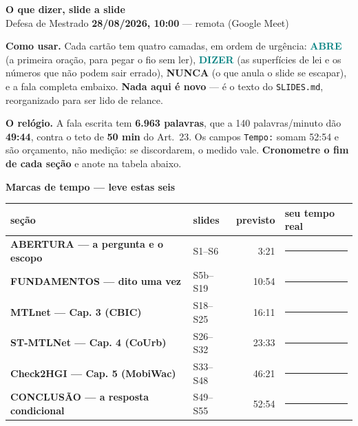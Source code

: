 \documentclass[11pt,a4paper]{article}
\begin{document}
\begin{center}
{\Huge\bfseries\color{teal} O que dizer, slide a slide}\\[3mm]
{\large Defesa de Mestrado \textbf{28/08/2026, 10:00} --- remota (Google Meet)}
\end{center}
\vspace{3mm}
\begin{tcolorbox}[colback=band,colframe=teal,boxrule=0.8pt,arc=2pt]
\textbf{Como usar.} Cada cartão tem quatro camadas, em ordem de urgência:
\textbf{\textcolor{teal}{ABRE}} (a primeira oração, para pegar o fio sem ler),
\textbf{\textcolor{teal}{DIZER}} (as superfícies de lei e os números que não podem sair errado),
\textbf{\textcolor{crim}{NUNCA}} (o que anula o slide se escapar), e a fala completa embaixo.
\textbf{Nada aqui é novo} --- é o texto do \texttt{SLIDES.md}, reorganizado para ser lido de relance.
\smallskip

\textbf{\textcolor{crim}{O relógio.}} A fala escrita tem \textbf{6.963 palavras},
que a 140 palavras/minuto dão \textbf{49:44}, contra o teto de \textbf{50 min} do Art.~23.
Os campos \texttt{Tempo:} somam 52:54 e são orçamento, não medição: se discordarem, o medido vale.
\textbf{Cronometre o fim de cada seção} e anote na tabela abaixo.
\end{tcolorbox}
\vspace{4mm}

{\large\bfseries\color{teal} Marcas de tempo --- leve estas seis}
\vspace{2mm}

\begin{tabular}{@{}p{62mm} p{22mm} r p{34mm}@{}}
\hline
\textbf{seção} & \textbf{slides} & \textbf{previsto} & \textbf{seu tempo real} \\
\hline

\textbf{ABERTURA --- a pergunta e o escopo} & S1--S6 & 3:21 & \rule{32mm}{0.4pt} \\
\textbf{FUNDAMENTOS --- dito uma vez} & S5b--S19 & 10:54 & \rule{32mm}{0.4pt} \\
\textbf{MTLnet --- Cap. 3 (CBIC)} & S18--S25 & 16:11 & \rule{32mm}{0.4pt} \\
\textbf{ST-MTLNet --- Cap. 4 (CoUrb)} & S26--S32 & 23:33 & \rule{32mm}{0.4pt} \\
\textbf{Check2HGI --- Cap. 5 (MobiWac)} & S33--S48 & 46:21 & \rule{32mm}{0.4pt} \\
\textbf{CONCLUSÃO --- a resposta condicional} & S49--S55 & 52:54 & \rule{32mm}{0.4pt} \\
\hline
\end{tabular}
\clearpage
\end{document}
